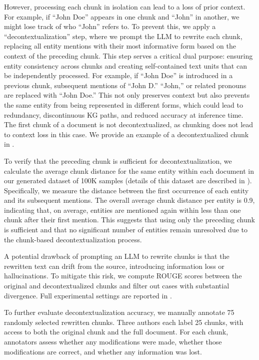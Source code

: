 \documentclass{article} %
\begin{document}
However, processing each chunk in isolation can lead to a loss of prior context. For example, if ``John Doe'' appears in one chunk and ``John'' in another, we might lose track of who ``John'' refers to. To prevent this, we apply a ``decontextualization'' step, where we prompt the LLM to rewrite each chunk, replacing all entity mentions with their most informative form based on the context of the preceding chunk. This step serves a critical dual purpose: ensuring entity consistency across chunks and creating self-contained text units that can be independently processed. For example, if ``John Doe'' is introduced in a previous chunk, subsequent mentions of ``John D.'' ``John,'' or related pronouns are replaced with ``John Doe.'' This not only preserves context but also prevents the same entity from being represented in different forms, which could lead to redundancy, discontinuous KG paths, and reduced accuracy at inference time. The first chunk of a document is not decontextualized, as chunking does not lead to context loss in this case. We provide an example of a decontextualized chunk in .

To verify that the preceding chunk is sufficient for decontextualization, we calculate the average chunk distance for the same entity within each document in our generated dataset of 100K samples (details of this dataset are described in ). 
Specifically, we measure the distance between the first occurrence of each entity and its subsequent mentions. 
The overall average chunk distance per entity is 0.9, indicating that, on average, entities are mentioned again within less than one chunk after their first mention. This suggests that using only the preceding chunk is sufficient and that no significant number of entities remain unresolved due to the chunk-based decontextualization process.

A potential drawback of prompting an LLM to rewrite chunks is that the rewritten text can drift from the source, introducing information loss or hallucinations. To mitigate this risk, we compute ROUGE scores between the original and decontextualized chunks and filter out cases with substantial divergence. Full experimental settings are reported in .

To further evaluate decontextualization accuracy, we manually annotate 75 randomly selected rewritten chunks. Three authors each label 25 chunks, with access to both the original chunk and the full document. For each chunk, annotators assess whether any modifications were made, whether those modifications are correct, and whether any information was lost.
\end{document}
